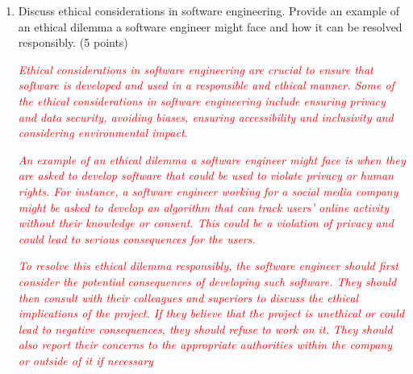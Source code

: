 \documentclass{article}
\begin{document}
\begin{enumerate}
             \item Discuss ethical considerations in software engineering. Provide an example
             of an ethical dilemma a software engineer might face and how it can be
             resolved responsibly. (5 points)\par
             \textcolor{red}{\textit{Ethical considerations in software engineering are crucial to ensure that software is 
             developed and used in a responsible and ethical manner. Some of the ethical considerations in software engineering 
             include ensuring privacy and data security, avoiding biases, ensuring accessibility and inclusivity and considering 
             environmental impact.}} \par
             \textcolor{red}{\textit{An example of an ethical dilemma a software engineer might face is when they are asked to develop software 
             that could be used to violate privacy or human rights. For instance, a software engineer working for a social media 
             company might be asked to develop an algorithm that can track users’ online activity without their knowledge or consent. 
             This could be a violation of privacy and could lead to serious consequences for the users.}}\par
             \textcolor{red}{\textit{To resolve this ethical dilemma responsibly, the software engineer should first consider the 
             potential consequences of developing such software. They should then consult with their colleagues and superiors to 
             discuss the ethical implications of the project. If they believe that the project is unethical or could lead to negative 
             consequences, they should refuse to work on it. They should also report their concerns to the appropriate authorities within 
             the company or outside of it if necessary}}


\end{enumerate}
\end{document}
